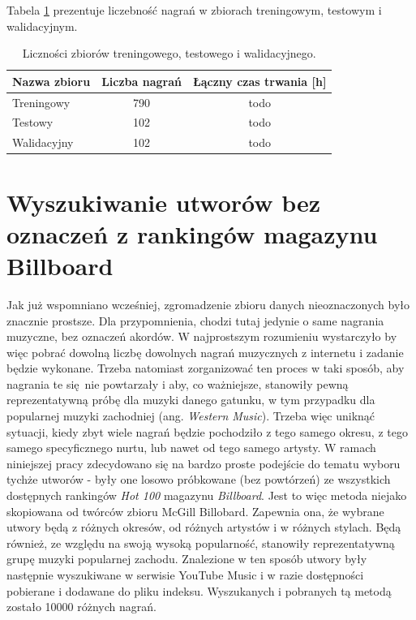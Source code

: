 Tabela \ref{tab:datasets3} prezentuje liczebność nagrań w zbiorach treningowym, testowym i
walidacyjnym.

\begin{table}
    \centering
    \caption{Liczności zbiorów treningowego, testowego i walidacyjnego.}
    \label{tab:datasets3}
    \begin{tabular}{|l|c|c|}
        \hline
        Nazwa zbioru & Liczba nagrań & Łączny czas trwania [h] \\
        \hline
        Treningowy  & 790 & todo \\
        Testowy     & 102 & todo \\
        Walidacyjny & 102 & todo \\
        \hline
    \end{tabular}
\end{table}


\section{Wyszukiwanie utworów bez oznaczeń z rankingów magazynu Billboard}

Jak już wspomniano wcześniej, zgromadzenie zbioru danych nieoznaczonych było znacznie prostsze. Dla
przypomnienia, chodzi tutaj jedynie o same nagrania muzyczne, bez oznaczeń akordów. W najprostszym
rozumieniu wystarczyło by więc pobrać dowolną liczbę dowolnych nagrań muzycznych z internetu i
zadanie będzie wykonane. Trzeba natomiast zorganizować ten proces w taki sposób, aby nagrania te
się nie powtarzały i aby, co ważniejsze, stanowiły pewną reprezentatywną próbę dla muzyki danego
gatunku, w tym przypadku dla popularnej muzyki zachodniej (ang. \emph{Western Music}). Trzeba więc
uniknąć sytuacji, kiedy zbyt wiele nagrań będzie pochodziło z tego samego okresu, z tego samego
specyficznego nurtu, lub nawet od tego samego artysty. W ramach niniejszej pracy zdecydowano się na
bardzo proste podejście do tematu wyboru tychże utworów - były one losowo próbkowane (bez powtórzeń)
ze wszystkich dostępnych rankingów \emph{Hot 100} magazynu \emph{Billboard}. Jest to więc metoda
niejako skopiowana od twórców zbioru McGill Billobard. Zapewnia ona, że wybrane utwory będą z
różnych okresów, od różnych artystów i w różnych stylach. Będą również, ze względu na swoją wysoką
popularność, stanowiły reprezentatywną grupę muzyki popularnej zachodu. Znalezione w ten sposób
utwory były następnie wyszukiwane w serwisie YouTube Music i w razie dostępności pobierane i
dodawane do pliku indeksu. Wyszukanych i pobranych tą metodą zostało 10000 różnych nagrań.

